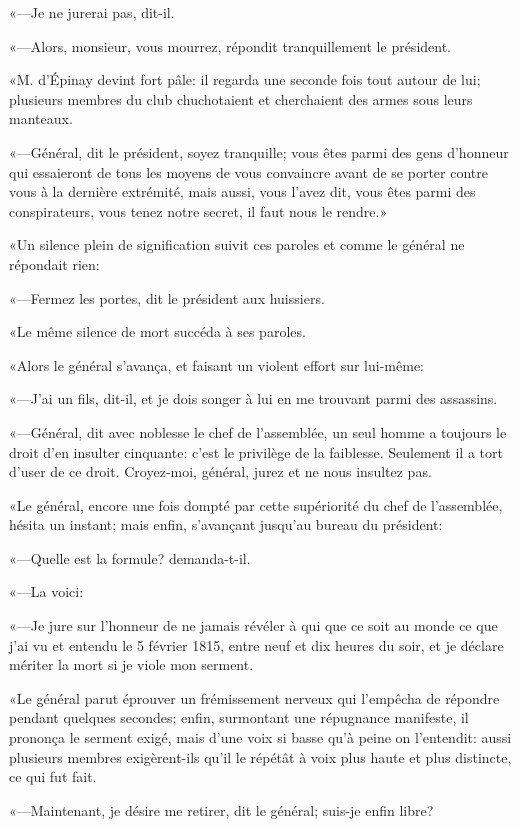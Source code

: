 «—Je ne jurerai pas, dit-il. 

«—Alors, monsieur, vous mourrez, répondit tranquillement le président. 

«M. d'Épinay devint fort pâle: il regarda une seconde fois tout autour de lui; plusieurs membres du club chuchotaient et cherchaient des armes sous leurs manteaux. 

«—Général, dit le président, soyez tranquille; vous êtes parmi des gens d'honneur qui essaieront de tous les moyens de vous convaincre avant de se porter contre vous à la dernière extrémité, mais aussi, vous l'avez dit, vous êtes parmi des conspirateurs, vous tenez notre secret, il faut nous le rendre.» 

«Un silence plein de signification suivit ces paroles et comme le général ne répondait rien: 

«—Fermez les portes, dit le président aux huissiers. 

«Le même silence de mort succéda à ses paroles. 

«Alors le général s'avança, et faisant un violent effort sur lui-même: 

«—J'ai un fils, dit-il, et je dois songer à lui en me trouvant parmi des assassins. 

«—Général, dit avec noblesse le chef de l'assemblée, un seul homme a toujours le droit d'en insulter cinquante: c'est le privilège de la faiblesse. Seulement il a tort d'user de ce droit. Croyez-moi, général, jurez et ne nous insultez pas. 

«Le général, encore une fois dompté par cette supériorité du chef de l'assemblée, hésita un instant; mais enfin, s'avançant jusqu'au bureau du président: 

«—Quelle est la formule? demanda-t-il. 

«—La voici: 

«—Je jure sur l'honneur de ne jamais révéler à qui que ce soit au monde ce que j'ai vu et entendu le 5 février 1815, entre neuf et dix heures du soir, et je déclare mériter la mort si je viole mon serment. 

«Le général parut éprouver un frémissement nerveux qui l'empêcha de répondre pendant quelques secondes; enfin, surmontant une répugnance manifeste, il prononça le serment exigé, mais d'une voix si basse qu'à peine on l'entendit: aussi plusieurs membres exigèrent-ils qu'il le répétât à voix plus haute et plus distincte, ce qui fut fait. 

«—Maintenant, je désire me retirer, dit le général; suis-je enfin libre? 

